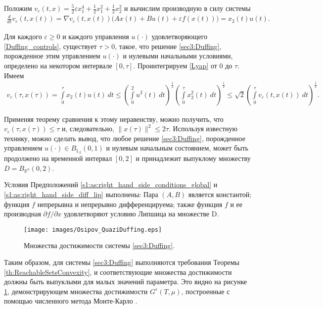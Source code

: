 \documentclass[../main.tex]{subfiles}
\begin{document}
 Положим $v_{\varepsilon}(t,x) = \frac{5}{2}\varepsilon x_1^4 + \frac{1}{2}x_1^2 + \frac{1}{2}x_2^2$ и вычислим производную в силу системы 
 \begin{gather}\label{Lyap}
 \frac{d}{dt} v_{\varepsilon}(t,x(t)) = \nabla v_{\varepsilon}(t,x(t)) \big(A x(t) + B u(t) + \varepsilon f(x(t))\big) = x_2(t) u(t). 
 \end{gather} 
 
 Для каждого $\varepsilon \geqslant 0$ и каждого управления $u(\cdot)$ удовлетворяющего \eqref{Duffing_controls}, существует $\tau>0$, такое, что решение \eqref{sec3:Duffing}, порожденное этим управлением $u(\cdot)$ и нулевыми начальными условиями, определено на некотором интервале $[0, \tau]$. 
 Проинтегрируем \eqref{Lyap} от $0$ до $\tau$. 
 Имеем 
 \begin{gather*}
 v_{\varepsilon}(\tau,x(\tau)) =
 \int\limits_0^{\tau} x_2(t) u(t) \ dt 
 \leqslant 
 \left(\int\limits_0^2 u^2(t) \ dt \right)^{\frac{1}{2}} \left(\int\limits_0^{\tau} x_2^2(t) \ dt \right)^{\frac{1}{2}} \leqslant \sqrt{2} \left(\int\limits_0^{\tau} v_{\varepsilon}(t,x(t)) \ dt \right)^{\frac{1}{2}}.
 \end{gather*}
 
 Применяя теорему сравнения к этому неравенству, можно получить, что $v_{\varepsilon}(\tau,x(\tau)) \leqslant \tau$ и, следовательно, $\|x(\tau)\|^2 \leqslant 2 \tau$. 
 Используя известную технику, можно сделать вывод, что любое решение \eqref{sec3:Duffing}, порожденное управлением $u(\cdot) \in B_{\mathbb{L}_2}(0,1)$ и нулевым начальным состоянием, может быть продолжено на временной интервал $[0,2]$ и принадлежит выпуклому множеству $D = B_{\mathbb{R}^n}(0,2)$.
 
 Условия Предположений \ref{s1:as:right_hand_side_conditions_global} и \ref{s1:as:right_hand_side_diff_lip} выполнены: Пара $(A,B)$ является константой; функция $f$ непрерывна и непрерывно дифференцируема; также функция $f$ и ее производная $\partial f/\partial x$ удовлетворяют условию Липшица на множестве D.
 
 \begin{figure}[t]
 \centerline{
 \texttt{[image: images/Osipov\_QuaziDuffing.eps]}}
 \caption{Множества достижимости системы \eqref{sec3:Duffing}.}
 \label{fig:Duffing}
 \end{figure}
 
 Таким образом, для системы \eqref{sec3:Duffing} выполняются требования Теоремы \ref{th:ReachableSetsConvexity}, и соответствующие множества достижимости должны быть выпуклыми для малых значений параметра. 
 Это видно на рисунке \ref{fig:Duffing}, демонстрирующем множества достижимости $G^{\varepsilon}(T,\mu)$, построенные с помощью численного метода Монте-Карло \cite{Patent,Zykov}.
 
\end{document}
